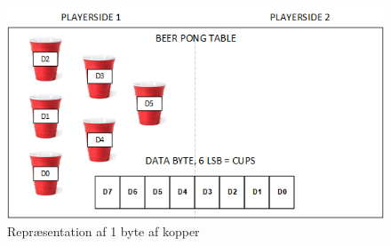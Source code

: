 \documentclass[Arkitektur/System_main.tex]{subfiles}
\begin{document}
\begin{figure}[H]
    \centering
    \includegraphics[width=\textwidth]{Arkitektur/Grenseflader/Graphics/cups.png}
    \caption{Repræsentation af 1 byte af kopper}
    \label{fig:cups_setup}
\end{figure}
\end{document}
